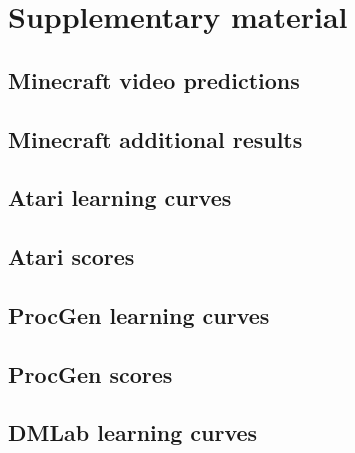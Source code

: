 \clearpage
\section*{Supplementary material}

\subsection*{Minecraft video predictions}

\vspace*{-4ex}

\clearpage
\subsection*{Minecraft additional results}
\noindent
\begin{minipage}[b]{.46\textwidth}

\end{minipage}\hfill
\begin{minipage}[b]{.46\textwidth}

\end{minipage}



\clearpage
\subsection*{Atari learning curves}


\clearpage
\subsection*{Atari scores}
\vspace*{-1ex}


\clearpage
\subsection*{ProcGen learning curves}


\clearpage
\subsection*{ProcGen scores}


\clearpage
\subsection*{DMLab learning curves}


